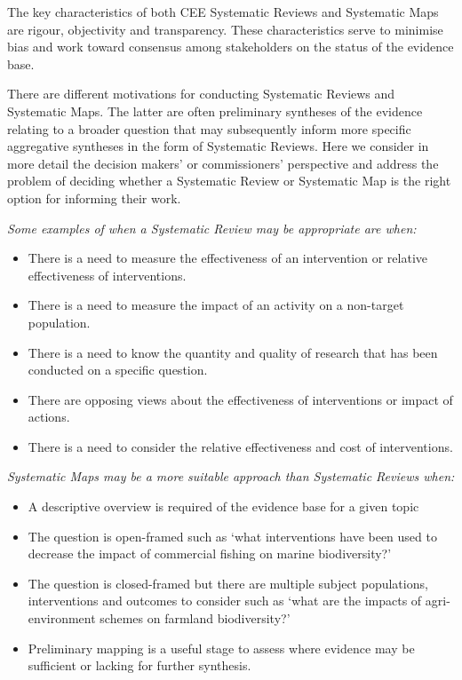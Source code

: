 \documentclass[
  letterpaper,
  DIV=11,
  numbers=noendperiod]{scrreprt}
\begin{document}
The key characteristics of both CEE Systematic Reviews and Systematic
Maps are rigour, objectivity and transparency. These characteristics
serve to minimise bias and work toward consensus among stakeholders on
the status of the evidence base.

There are different motivations for conducting Systematic Reviews and
Systematic Maps. The latter are often preliminary syntheses of the
evidence relating to a broader question that may subsequently inform
more specific aggregative syntheses in the form of Systematic Reviews.
Here we consider in more detail the decision makers' or commissioners'
perspective and address the problem of deciding whether a Systematic
Review or Systematic Map is the right option for informing their work.

\emph{Some examples of when a Systematic Review may be appropriate are
when:}

\begin{itemize}
\item
  There is a need to measure the effectiveness of an intervention or
  relative effectiveness of interventions.
\item
  There is a need to measure the impact of an activity on a non-target
  population.
\item
  There is a need to know the quantity and quality of research that has
  been conducted on a specific question.
\item
  There are opposing views about the effectiveness of interventions or
  impact of actions.
\item
  There is a need to consider the relative effectiveness and cost of
  interventions.
\end{itemize}

\emph{Systematic Maps may be a more suitable approach than Systematic
Reviews when:}

\begin{itemize}
\item
  A descriptive overview is required of the evidence base for a given
  topic
\item
  The question is open-framed such as `what interventions have been used
  to decrease the impact of commercial fishing on marine biodiversity?'
\item
  The question is closed-framed but there are multiple subject
  populations, interventions and outcomes to consider such as `what are
  the impacts of agri-environment schemes on farmland biodiversity?'
\item
  Preliminary mapping is a useful stage to assess where evidence may be
  sufficient or lacking for further synthesis.
\end{itemize}
\end{document}
